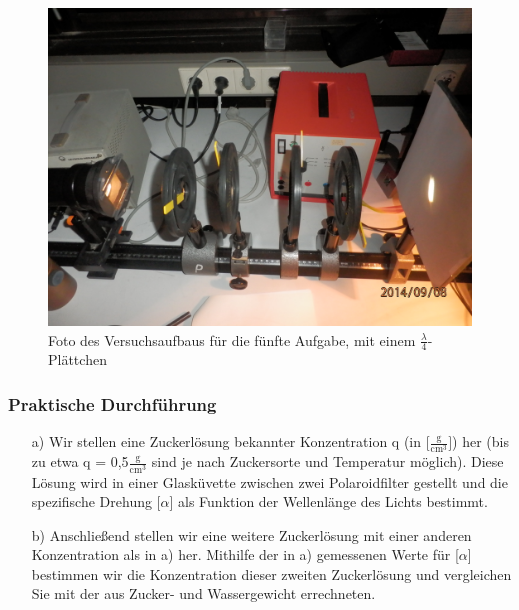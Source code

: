 \documentclass[12pt]{scrartcl}
\begin{document}
\begin{figure}[H]
\centering
    \includegraphics[scale = 0.1]{aufgabe_5_2.JPG}
  	\caption[Foto des Versuchsaufbaus für die fünfte Aufgabe, mit einem $\frac{\lambda}{4}$-Plättchen]{Foto des Versuchsaufbaus für die fünfte Aufgabe, mit einem $\frac{\lambda}{4}$-Plättchen}
  \label{fig:aufgabe_2}
\end{figure}

\subsubsection{Praktische Durchführung}
\begin{enumerate}
\item[a)] Wir stellen eine Zuckerlösung bekannter Konzentration q (in [$\frac{\text{g}}{\text{cm}^3}]$)
her (bis zu etwa q = 0,5$\frac{\text{g}}{\text{cm}^3}$
sind je nach Zuckersorte und Temperatur möglich).
Diese Lösung wird in einer Glasküvette zwischen zwei Polaroidfilter gestellt und die spezifische Drehung [$\alpha$]
als Funktion der Wellenlänge des Lichts bestimmt.
\item[b)] Anschließend stellen wir eine weitere Zuckerlösung mit einer anderen Konzentration als
in a) her. Mithilfe der in a) gemessenen Werte für
[$\alpha$] bestimmen wir die Konzentration dieser zweiten Zuckerlösung und vergleichen Sie mit der aus Zucker- und
Wassergewicht errechneten.
\end{enumerate}
\end{document}
